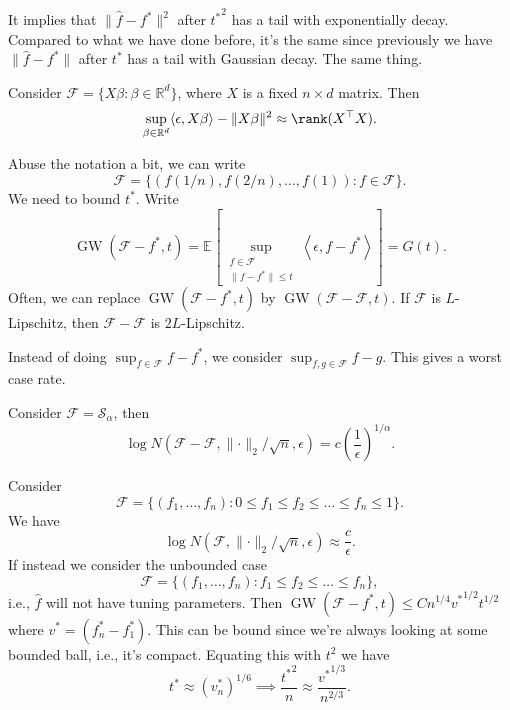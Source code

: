 \begin{remark}
	It implies that \(\lVert \hat{f} - f^{\ast}  \rVert ^2\) after \({t^{\ast} }^2\) has a tail with exponentially decay. Compared to what we have done before, it's the same since previously we have \(\lVert \hat{f} - f^{\ast}  \rVert \) after \(t^{\ast} \) has a tail with Gaussian decay. The same thing.
\end{remark}

\begin{eg}
	Consider \(\mathscr{F} = \{ X \beta \colon \beta \in \mathbb{R} ^d \} \), where \(X\) is a fixed \(n \times d\) matrix. Then
	\[
		\sup _{\beta \in \mathbb{R} ^d} \langle \epsilon , X \beta  \rangle - \lVert X \beta  \rVert ^2 \approx \rank (X ^{\top} X).
	\]
\end{eg}

\begin{eg}
	Abuse the notation a bit, we can write
	\[
		\mathscr{F} = \{ (f(1 / n), f(2 / n), \dots , f(1)) \colon f\in \mathscr{F} \}.
	\]
	We need to bound \(t^{\ast} \). Write
	\[
		\mathop{\mathrm{GW}}(\mathscr{F} - f^{\ast} , t)
		= \mathbb{E}_{}\left[\sup _{\substack{f\in \mathscr{F} \\ \lVert f - f^{\ast} \rVert \leq t}} \left\langle \epsilon , f - f^{\ast}  \right\rangle \right] = G(t).
	\]
	Often, we can replace \(\mathop{\mathrm{GW}}(\mathscr{F} - f^{\ast} , t) \) by \(\mathop{\mathrm{GW}}(\mathscr{F} - \mathscr{F} , t) \). If \(\mathscr{F} \) is \(L\)-Lipschitz, then \(\mathscr{F} - \mathscr{F} \) is \(2L\)-Lipschitz.
\end{eg}

Instead of doing \(\sup _{f\in \mathscr{F} } f - f^{\ast} \), we consider \(\sup _{f, g \in \mathscr{F} } f - g\). This gives a worst case rate.

\begin{eg}
	Consider \(\mathscr{F} = \mathcal{S} _\alpha \), then
	\[
		\log N(\mathscr{F} - \mathscr{F} , \lVert \cdot \rVert _2 / \sqrt{n} , \epsilon ) = c \left( \frac{1}{\epsilon } \right) ^{1 / \alpha }.
	\]
\end{eg}

\begin{eg}
	Consider
	\[
		\mathscr{F} = \{(f_1, \dots , f_n) \colon 0 \leq f_1 \leq f_2 \leq \dots \leq f_n \leq 1 \}.
	\]
	We have
	\[
		\log N(\mathscr{F} , \lVert \cdot \rVert _2 / \sqrt{n} , \epsilon ) \approx \frac{c}{\epsilon }.
	\]
	If instead we consider the unbounded case
	\[
		\mathscr{F} = \{(f_1, \dots , f_n) \colon f_1 \leq f_2 \leq \dots \leq f_n \},
	\]
	i.e., \(\hat{f} \) will not have tuning parameters. Then \(\mathop{\mathrm{GW}}(\mathscr{F} - f^{\ast} , t) \leq C n^{1 / 4} {v^{\ast} }^{1 / 2} t^{1 / 2}\) where \(v^{\ast} = (f^{\ast} _n - f^{\ast} _1)\). This can be bound since we're always looking at some bounded ball, i.e., it's compact. Equating this with \(t^2\) we have
	\[
		t^{\ast} \approx (v^{\ast} _n)^{1 / 6}
		\implies \frac{{t^{\ast} }^2}{n} \approx \frac{{v^{\ast} }^{1 / 3}}{n^{2 / 3}}.
	\]
\end{eg}


